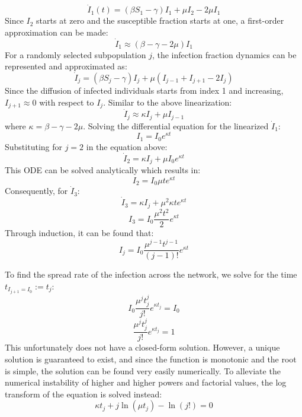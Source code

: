 \begin{equation}
\dot I_1(t)=(\beta S_1-\gamma)I_1+\mu I_2-2\mu I_1
\end{equation}
Since $I_2$ starts at zero and the susceptible fraction starts at one, a first-order approximation can be made:
\begin{equation}
\dot I_1 \approx (\beta-\gamma-2\mu)I_1
\end{equation}
For a randomly selected subpopulation $j$, the infection fraction dynamics can be represented and approximated as:
\begin{equation}
\dot I_j =(\beta S_j-\gamma)I_j+\mu (I_{j-1}+I_{j+1}-2 I_j)
\end{equation}
Since the diffusion of infected individuals starts from index 1 and increasing, $I_{j+1} \approx 0$ with respect to $I_j$. Similar to the above linearization:
\begin{equation}
\dot I_j \approx \kappa I_j+\mu I_{j-1}
\end{equation}
where $\kappa = \beta-\gamma-2\mu$. Solving the differential equation for the linearized $\dot I_1$:
\begin{equation}
I_1 = I_0 e^{\kappa t}
\end{equation}
Substituting for $j=2$ in the equation above:
\begin{equation}
\dot I_2=\kappa I_j +\mu I_0 e^{\kappa t}
\end{equation}
This ODE can be solved analytically which results in:
\begin{equation}
I_2=I_0 \mu t e^{\kappa t}  
\end{equation}
Consequently, for $\dot I_3$:
\begin{equation}
\dot I_3=\kappa I_j +\mu^2 \kappa t e^{\kappa t}
\end{equation}
\begin{equation}
I_3 = I_0 \frac{\mu^2 t^2}{2} e^{\kappa t}
\end{equation}
Through induction, it can be found that:
\begin{equation}
I_j=I_0 \frac{\mu^{j-1} t^{j-1}}{(j-1)!} e^{\kappa t}
\end{equation}

To find the spread rate of the infection across the network, we solve for the time $t_{I_{j+1}=I_0} :=t_j$:
\begin{equation}
I_0 \frac{\mu^{j} t_j^{j}}{j!} e^{\kappa t_j} = I_0
\end{equation}
\begin{equation}
\frac{\mu^{j} t_j^{j}}{j!} e^{\kappa t_j} = 1 
\end{equation}
This unfortunately does not have a closed-form solution. However, a unique solution is guaranteed to exist, and since the function is monotonic and the root is simple, the solution can be found very easily numerically. To alleviate the numerical instability of higher and higher powers and factorial values, the log transform of the equation is solved instead:
\begin{equation}
\kappa t_j + j \ln(\mu t_j) - \ln(j!) = 0
\end{equation}

